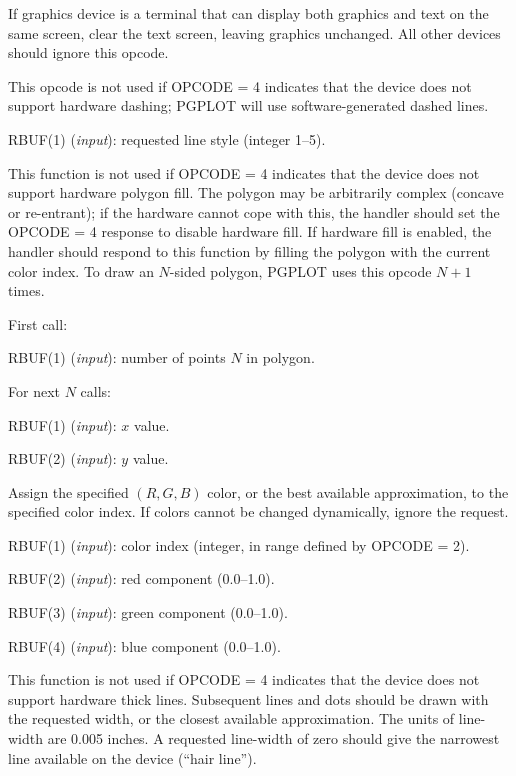 If graphics device is a terminal that can display both graphics
and text on the same screen, clear the text screen, leaving graphics
unchanged. All other devices should ignore this opcode.


This opcode is not used if OPCODE = 4 indicates that the device does not
support hardware dashing; PGPLOT will use software-generated dashed
lines. 

RBUF(1) ({\it input\/}): requested line style (integer 1--5).

This function is not used if OPCODE = 4 indicates that the device does not
support hardware polygon fill. The polygon may be arbitrarily complex
(concave or re-entrant); if the hardware cannot cope with this, the
handler should set the OPCODE = 4 response to disable hardware fill. 
If hardware fill is enabled, the handler should respond to this function 
by filling the polygon with the current color index. 
To draw an $N$-sided polygon, PGPLOT uses this opcode $N+1$ times.

First call:

RBUF(1) ({\it input\/}): number of points $N$ in polygon.

For next $N$ calls:

RBUF(1) ({\it input\/}): $x$ value.

RBUF(2) ({\it input\/}): $y$ value.


Assign the specified $(R,G,B)$ color, or the best available
approximation, to the specified color index. If colors cannot be changed
dynamically, ignore the request. 

RBUF(1) ({\it input\/}): color index (integer, in range defined by OPCODE = 2).

RBUF(2) ({\it input\/}): red component (0.0--1.0).

RBUF(3) ({\it input\/}): green component (0.0--1.0).

RBUF(4) ({\it input\/}): blue component (0.0--1.0).


This function is not used if OPCODE = 4 indicates that
the device does not support hardware thick lines.  Subsequent lines
and dots should be drawn with the requested width, or the closest
available approximation. The units of line-width are 0.005 inches.
A requested line-width of zero should give the narrowest line available 
on the device (``hair line'').

